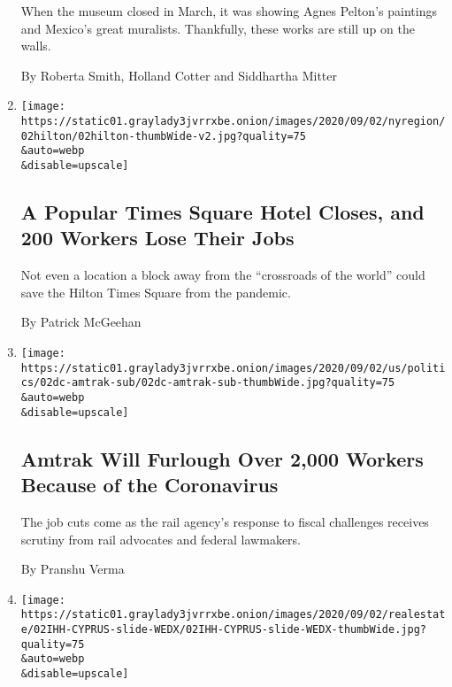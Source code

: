 \begin{enumerate}
  When the museum closed in March, it was showing Agnes Pelton's
  paintings and Mexico's great muralists. Thankfully, these works are
  still up on the walls.

  By Roberta Smith, Holland Cotter and Siddhartha Mitter
\item
  \href{/interactive/2020/09/02/nyregion/hilton-times-square-hotel-closing.html}{}

  \texttt{[image: https://static01.graylady3jvrrxbe.onion/images/2020/09/02/nyregion/02hilton/02hilton-thumbWide-v2.jpg?quality=75\\\&auto=webp\\\&disable=upscale]}

  \hypertarget{a-popular-times-square-hotel-closes-and-200-workers-lose-their-jobs}{%
  \subsection{A Popular Times Square Hotel Closes, and 200 Workers Lose
  Their
  Jobs}\label{a-popular-times-square-hotel-closes-and-200-workers-lose-their-jobs}}

  Not even a location a block away from the ``crossroads of the world''
  could save the Hilton Times Square from the pandemic.

  By Patrick McGeehan
\item
  \href{/2020/09/02/us/politics/coronavirus-amtrak-furloughs.html}{}

  \texttt{[image: https://static01.graylady3jvrrxbe.onion/images/2020/09/02/us/politics/02dc-amtrak-sub/02dc-amtrak-sub-thumbWide.jpg?quality=75\\\&auto=webp\\\&disable=upscale]}

  \hypertarget{amtrak-will-furlough-over-2000-workers-because-of-the-coronavirus}{%
  \subsection{Amtrak Will Furlough Over 2,000 Workers Because of the
  Coronavirus}\label{amtrak-will-furlough-over-2000-workers-because-of-the-coronavirus}}

  The job cuts come as the rail agency's response to fiscal challenges
  receives scrutiny from rail advocates and federal lawmakers.

  By Pranshu Verma
\item
  \href{/2020/09/02/realestate/cyprus-real-estate.html}{}

  \texttt{[image: https://static01.graylady3jvrrxbe.onion/images/2020/09/02/realestate/02IHH-CYPRUS-slide-WEDX/02IHH-CYPRUS-slide-WEDX-thumbWide.jpg?quality=75\\\&auto=webp\\\&disable=upscale]}


\end{enumerate}
